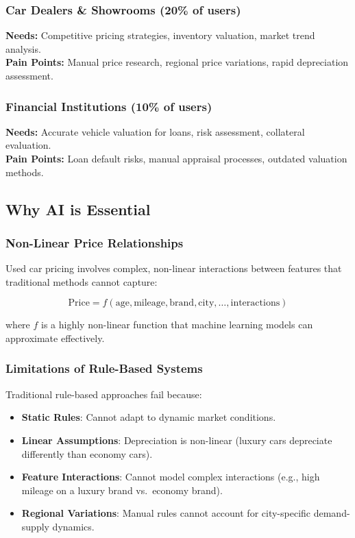 \documentclass[12pt,a4paper]{article}
\begin{document}
\subsubsection{Car Dealers \& Showrooms (20\% of users)}
\textbf{Needs:} Competitive pricing strategies, inventory valuation, market trend analysis.\\
\textbf{Pain Points:} Manual price research, regional price variations, rapid depreciation assessment.

\subsubsection{Financial Institutions (10\% of users)}
\textbf{Needs:} Accurate vehicle valuation for loans, risk assessment, collateral evaluation.\\
\textbf{Pain Points:} Loan default risks, manual appraisal processes, outdated valuation methods.

\subsection{Why AI is Essential}

\subsubsection{Non-Linear Price Relationships}

Used car pricing involves complex, non-linear interactions between features that traditional methods cannot capture:

\begin{equation}
\text{Price} = f(\text{age}, \text{mileage}, \text{brand}, \text{city}, \ldots, \text{interactions})
\end{equation}

where $f$ is a highly non-linear function that machine learning models can approximate effectively.

\subsubsection{Limitations of Rule-Based Systems}

Traditional rule-based approaches fail because:
\begin{itemize}
    \item \textbf{Static Rules}: Cannot adapt to dynamic market conditions.
    \item \textbf{Linear Assumptions}: Depreciation is non-linear (luxury cars depreciate differently than economy cars).
    \item \textbf{Feature Interactions}: Cannot model complex interactions (e.g., high mileage on a luxury brand vs.\ economy brand).
    \item \textbf{Regional Variations}: Manual rules cannot account for city-specific demand-supply dynamics.
\end{itemize}
\end{document}
